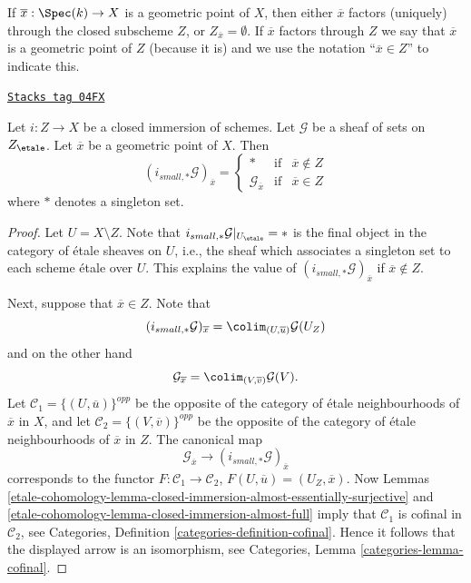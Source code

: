 If $\overline{x} : \Spec(k) \to X$ is a geometric point of $X$, then
either $\overline{x}$ factors (uniquely) through the closed subscheme $Z$, or
$Z_{\overline{x}} = \emptyset$. If $\overline{x}$ factors through $Z$
we say that $\overline{x}$ is a geometric point of $Z$ (because it is) and
we use the notation ``$\overline{x} \in Z$'' to indicate this.

\begin{lemma}
\label{etale-cohomology-lemma-stalk-pushforward-closed-immersion}
\href{https://stacks.math.columbia.edu/tag/04FX}{\texttt{Stacks tag 04FX}}

Let $i : Z \to X$ be a closed immersion of schemes.
Let $\mathcal{G}$ be a sheaf of sets on $Z_\etale$.
Let $\overline{x}$ be a geometric point of $X$.
Then
$$
(i_{small, *}\mathcal{G})_{\overline{x}} =
\left\{
\begin{matrix}
* & \text{if} & \overline{x} \not \in Z \\
\mathcal{G}_{\overline{x}} & \text{if} & \overline{x} \in Z
\end{matrix}
\right.
$$
where $*$ denotes a singleton set.
\end{lemma}

\begin{proof}
Let $U = X \setminus Z$.
Note that $i_{small, *}\mathcal{G}|_{U_\etale} = *$ is the final
object in the category of \'etale sheaves on $U$, i.e., the sheaf
which associates a singleton set to each scheme \'etale over $U$.
This explains the value of $(i_{small, *}\mathcal{G})_{\overline{x}}$
if $\overline{x} \not \in Z$.

\medskip\noindent
Next, suppose that $\overline{x} \in Z$. Note that
$$
(i_{small, *}\mathcal{G})_{\overline{x}}
=
\colim_{(U, \overline{u})} \mathcal{G}(U_Z)
$$
and on the other hand
$$
\mathcal{G}_{\overline{x}}
=
\colim_{(V, \overline{v})} \mathcal{G}(V).
$$
Let $\mathcal{C}_1 = \{(U, \overline{u})\}^{opp}$ be the opposite of the
category of \'etale neighbourhoods of $\overline{x}$ in $X$, and let
$\mathcal{C}_2 = \{(V, \overline{v})\}^{opp}$ be the opposite of the
category of \'etale neighbourhoods of $\overline{x}$ in $Z$. The canonical map
$$
\mathcal{G}_{\overline{x}}
\longrightarrow
(i_{small, *}\mathcal{G})_{\overline{x}}
$$
corresponds to the functor $F : \mathcal{C}_1 \to \mathcal{C}_2$,
$F(U, \overline{u}) = (U_Z, \overline{x})$. Now
Lemmas \ref{etale-cohomology-lemma-closed-immersion-almost-essentially-surjective} and
\ref{etale-cohomology-lemma-closed-immersion-almost-full}
imply that $\mathcal{C}_1$ is cofinal in $\mathcal{C}_2$, see
Categories, Definition \ref{categories-definition-cofinal}.
Hence it follows that the displayed arrow is an isomorphism, see
Categories, Lemma \ref{categories-lemma-cofinal}.
\end{proof}

